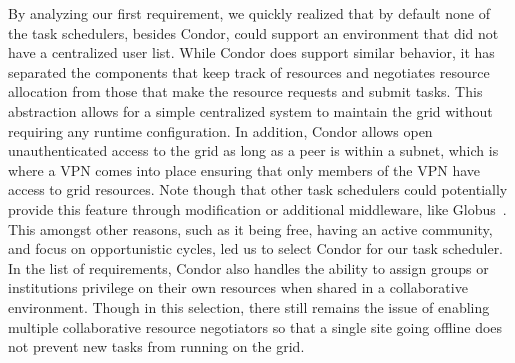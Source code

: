 \documentclass{sig-alternate}
\begin{document}
By analyzing our first requirement, we quickly realized that by default none of
the task schedulers, besides Condor, could support an environment that did not
have a centralized user list.  While Condor does support similar behavior, it has
separated the components that keep track of resources and negotiates resource
allocation from those that make the resource requests and submit tasks.  This
abstraction allows for a simple centralized system to maintain the grid without
requiring any runtime configuration.  In addition, Condor allows open
unauthenticated access to the grid as long as a peer is within a subnet, which
is where a VPN comes into place ensuring that only members of the VPN have
access to grid resources.  Note though that other task schedulers could
potentially provide this feature through modification or additional middleware,
like Globus~\cite{globus_toolkit}.  This amongst other reasons, such as it being
free, having an active community, and focus on opportunistic cycles, led us to
select Condor for our task scheduler.  In the list of requirements, Condor also
handles the ability to assign groups or institutions privilege on their own
resources when shared in a collaborative environment.  Though in this
selection, there still remains the issue of enabling multiple collaborative
resource negotiators so that a single site going offline does not prevent new
tasks from running on the grid.

\end{document}
